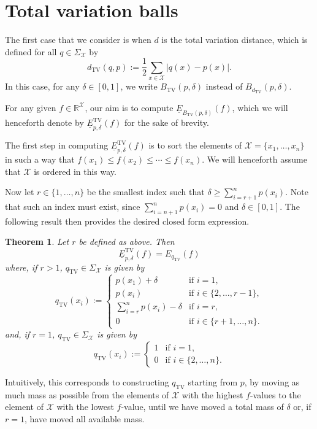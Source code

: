 \documentclass{article}
\newtheorem{theorem}{Theorem}
\begin{document}
\section{Total variation balls}\label{sec:tv}

The first case that we consider is when $d$ is the total variation distance, which is defined for all $q\in\Sigma_\mathcal{X}$ by
\begin{equation*}
    d_\mathrm{TV}(q,p):=\frac{1}{2}\sum_{x\in\mathcal{X}}|q(x)-p(x)|.
\end{equation*}
In this case, for any $\delta\in[0,1]$, we write $B_\mathrm{TV}(p,\delta)$ instead of $B_{d_\mathrm{TV}}(p,\delta)$.

For any given $f\in\mathbb{R}^\mathcal{X}$, our aim is to compute $\underline{E}_{B_\mathrm{TV}(p,\delta)}(f)$, which we will henceforth denote by $\underline{E}^\mathrm{TV}_{p,\delta}(f)$ for the sake of brevity.

The first step in computing $\underline{E}^\mathrm{TV}_{p,\delta}(f)$ is to sort the elements of $\mathcal{X}=\{x_1,\ldots,x_n\}$ in such a way that $f(x_1)\leq f(x_2)\leq\cdots\leq f(x_n)$. We will henceforth assume that $\mathcal{X}$ is ordered in this way.

Now let $r\in\{1,\ldots,n\}$ be the smallest index such that $\delta\geq\sum_{i=r+1}^{n} p(x_i)$. Note that such an index must exist, since $\sum_{i=n+1}^n p(x_i)=0$ and $\delta\in[0,1]$.
The following result then provides the desired closed form expression.

\begin{theorem}\label{thm:lowerexpectationtv}
Let $r$ be defined as above. Then
\begin{equation*}
    \underline{E}^\mathrm{TV}_{p,\delta}(f)
    =
    E_{q_\mathrm{TV}}(f)
\end{equation*}
where, if $r>1$, $q_\mathrm{TV}\in\Sigma_\mathcal{X}$ is given by
\begin{equation*}
    q_\mathrm{TV}(x_i):=
    \begin{cases}
        p(x_1)+\delta & \text{if } i=1,\\
        p(x_i) & \text{if } i\in\{2,\ldots,r-1\},\\
        \sum_{i=r}^{n} p(x_i)-\delta & \text{if } i=r,\\
        0 & \text{if } i\in\{r+1,\ldots,n\}.
    \end{cases}
\end{equation*}
and, if $r=1$, $q_\mathrm{TV}\in\Sigma_\mathcal{X}$ is given by
\begin{equation*}
    q_\mathrm{TV}(x_i):=
    \begin{cases}
        1 & \text{if } i=1,\\
        0 & \text{if } i\in\{2,\ldots,n\}.
    \end{cases}
\end{equation*}
\end{theorem}
Intuitively, this corresponds to constructing $q_\mathrm{TV}$ starting from $p$, by moving as much mass as possible from the elements of $\mathcal{X}$ with the highest $f$-values to the element of $\mathcal{X}$ with the lowest $f$-value, until we have moved a total mass of $\delta$ or, if $r=1$, have moved all available mass.
\end{document}
